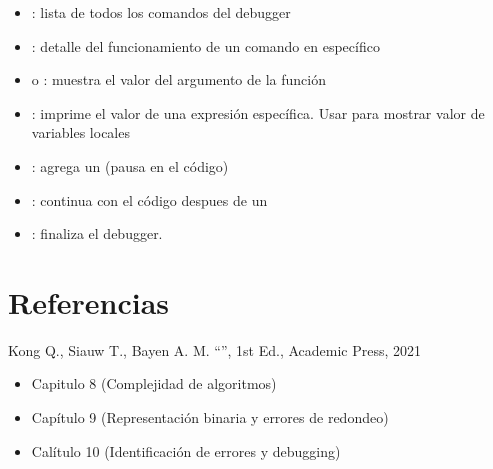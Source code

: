 \documentclass[letterpaper,10pt,english]{jupyterBook}
\begin{document}
\begin{itemize}
\item {} 
\sphinxAtStartPar
{}: lista de todos los comandos del debugger

\item {} 
\sphinxAtStartPar
{} : detalle del funcionamiento de un comando en específico

\item {} 
\sphinxAtStartPar
{} o : muestra el valor del argumento de la función

\item {} 
\sphinxAtStartPar
{}: imprime el valor de una expresión específica. Usar  para mostrar valor de variables locales

\item {} 
\sphinxAtStartPar
{}: agrega un  (pausa en el código)

\item {} 
\sphinxAtStartPar
{}: continua con el código despues de un 

\item {} 
\sphinxAtStartPar
{}: finaliza el debugger.

\end{itemize}


\section{Referencias}
\label{\detokenize{1.1-Aspectos_generales/1.1-Aspectos_generales:referencias}}
\sphinxAtStartPar
Kong Q., Siauw T., Bayen A. M. “”, 1st Ed., Academic Press, 2021
\begin{itemize}
\item {} 
\sphinxAtStartPar
Capitulo 8 (Complejidad de algoritmos)

\item {} 
\sphinxAtStartPar
Capítulo 9 (Representación binaria y errores de redondeo)

\item {} 
\sphinxAtStartPar
Calítulo 10 (Identificación de errores y debugging)

\end{itemize}
\end{document}
